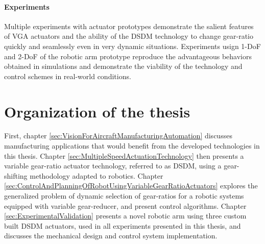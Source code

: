 \paragraph{Experiments}
%
Multiple experiments with actuator prototypes demonstrate the salient features of VGA actuators and the ability of the DSDM technology to change gear-ratio quickly and seamlessly even in very dynamic situations. Experiments usign 1-DoF and 2-DoF of the robotic arm prototype reproduce the advantageous behaviors obtained in simulations and demonstrate the viability of the technology and control schemes in real-world conditions.


\section{Organization of the thesis}
\label{sec:OrganisationOfTheThesis}

First, chapter \ref{sec:VisionForAircraftManufacturingAutomation} discusses manufacturing applications that would benefit from the developed technologies in this thesis. Chapter \ref{sec:MultipleSpeedActuationTechnology} then presents a variable gear-ratio actuator technology, referred to as DSDM, using a gear-shifting methodology adapted to robotics. Chapter \ref{sec:ControlAndPlanningOfRobotUsingVariableGearRatioActuators} explores the generalized problem of dynamic selection of gear-ratios for a robotic systems equipped with variable gear-reducer, and present control algorithms. Chapter \ref{sec:ExperimentalValidation} presents a novel robotic arm using three custom built DSDM actuators, used in all experiments presented in this thesis, and discusses the mechanical design and control system implementation. %



